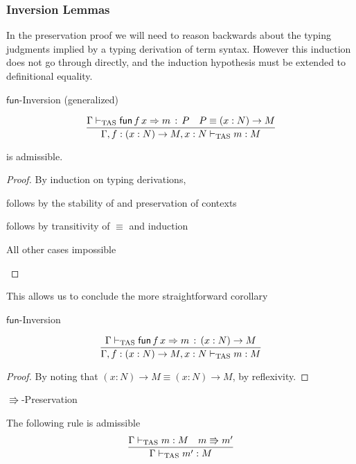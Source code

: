 \subsubsection{Inversion Lemmas}
In the preservation proof we will need to reason backwards about the typing judgments implied by a typing derivation of term syntax.
However this induction does not go through directly, and the induction hypothesis must be extended to definitional equality.
 
\begin{lem}
$\mathsf{fun}$-Inversion (generalized)
 
\[
\frac{\Gamma\vdash_{\mathrm{TAS}}\mathsf{fun}\,f\,x\Rightarrow m\,:\,P\quad P\equiv\left(x:N\right)\rightarrow M}{\Gamma,f:\left(x:N\right)\rightarrow M,x:N\vdash_{\mathrm{TAS}} m:M}
\]
 
is admissible.
\end{lem}
 
\begin{proof}
By induction on typing derivations,
 
\begin{casenv}
 \item {} follows by the stability of  and preservation of contexts
 \item {} follows by transitivity of $\equiv$ and induction
 \item All other cases impossible
\end{casenv}
 
\end{proof}
This allows us to conclude the more straightforward corollary
\begin{cor}
$\mathsf{fun}$-Inversion
 
\[
\frac{\Gamma\vdash_{\mathrm{TAS}}\mathsf{fun}\,f\,x\Rightarrow m\,:\,\left(x:N\right)\rightarrow M}{\Gamma,f:\left(x:N\right)\rightarrow M,x:N\vdash_{\mathrm{TAS}} m:M}
\]
\end{cor}
 
\begin{proof}
By noting that $\left(x:N\right)\rightarrow M\equiv\left(x:N\right)\rightarrow M$, by reflexivity.
\end{proof}
\begin{thm}
$\Rrightarrow$-Preservation
 
The following rule is admissible
\[
\frac{\Gamma\vdash_{\mathrm{TAS}} m:M\quad m\Rrightarrow m'}{\Gamma\vdash_{\mathrm{TAS}} m':M}
\]
\end{thm}
 
